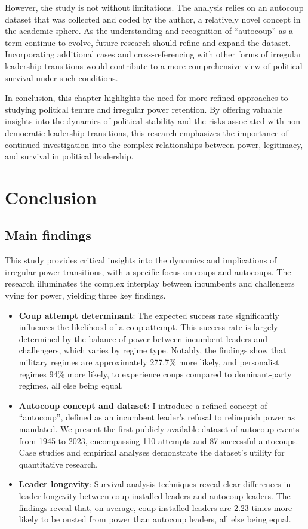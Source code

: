 \documentclass[
  12pt,
]{report}
\begin{document}
However, the study is not without limitations. The analysis relies on an
autocoup dataset that was collected and coded by the author, a
relatively novel concept in the academic sphere. As the understanding
and recognition of ``autocoup'' as a term continue to evolve, future
research should refine and expand the dataset. Incorporating additional
cases and cross-referencing with other forms of irregular leadership
transitions would contribute to a more comprehensive view of political
survival under such conditions.

In conclusion, this chapter highlights the need for more refined
approaches to studying political tenure and irregular power retention.
By offering valuable insights into the dynamics of political stability
and the risks associated with non-democratic leadership transitions,
this research emphasizes the importance of continued investigation into
the complex relationships between power, legitimacy, and survival in
political leadership.

\chapter{Conclusion}\label{conclusion}

\section{Main findings}\label{main-findings}

This study provides critical insights into the dynamics and implications
of irregular power transitions, with a specific focus on coups and
autocoups. The research illuminates the complex interplay between
incumbents and challengers vying for power, yielding three key findings.

\begin{itemize}
\item
  \textbf{Coup attempt determinant}: The expected success rate
  significantly influences the likelihood of a coup attempt. This
  success rate is largely determined by the balance of power between
  incumbent leaders and challengers, which varies by regime type.
  Notably, the findings show that military regimes are approximately
  277.7\% more likely, and personalist regimes 94\% more likely, to
  experience coups compared to dominant-party regimes, all else being
  equal.
\item
  \textbf{Autocoup concept and dataset}: I introduce a refined concept
  of ``autocoup'', defined as an incumbent leader's refusal to
  relinquish power as mandated. We present the first publicly available
  dataset of autocoup events from 1945 to 2023, encompassing 110
  attempts and 87 successful autocoups. Case studies and empirical
  analyses demonstrate the dataset's utility for quantitative research.
\item
  \textbf{Leader longevity}: Survival analysis techniques reveal clear
  differences in leader longevity between coup-installed leaders and
  autocoup leaders. The findings reveal that, on average, coup-installed
  leaders are 2.23 times more likely to be ousted from power than
  autocoup leaders, all else being equal.
\end{itemize}
\end{document}
